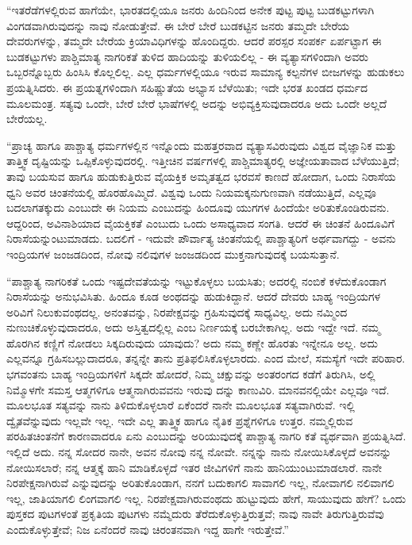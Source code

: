 “ಇತರೆಡೆಗಳಲ್ಲಿರುವ ಹಾಗೆಯೇ, ಭಾರತದಲ್ಲಿಯೂ ಜನರು ಹಿಂದಿನಿಂದ ಅನೇಕ ಪುಟ್ಟ ಪುಟ್ಟ ಬುಡಕಟ್ಟುಗಳಾಗಿ ವಿಂಗಡವಾಗಿರುವುದನ್ನು ನಾವು ನೋಡುತ್ತೇವೆ. ಈ ಬೇರೆ ಬೇರೆ ಬುಡಕಟ್ಟಿನ ಜನರು ತಮ್ಮದೇ ಬೇರೆಯ ದೇವರುಗಳನ್ನು, ತಮ್ಮದೇ ಬೇರೆಯ ಕ್ರಿಯಾವಿಧಿಗಳನ್ನು ಹೊಂದಿದ್ದರು. ಆದರೆ ಪರಸ್ಪರ ಸಂಪರ್ಕ ಏರ್ಪಟ್ಟಾಗ ಈ ಬುಡಕಟ್ಟುಗಳು ಪಾಶ್ಚಿಮಾತ್ಯ ನಾಗರಿಕತೆ ತುಳಿದ ಹಾದಿಯನ್ನು ತುಳಿಯಲಿಲ್ಲ - ಈ ವ್ಯತ್ಯಾಸಗಳಿಂದಾಗಿ ಅವರು ಒಬ್ಬರನ್ನೊಬ್ಬರು ಹಿಂಸಿಸಿ ಕೊಲ್ಲಲಿಲ್ಲ. ಎಲ್ಲ ಧರ್ಮಗಳಲ್ಲಿಯೂ ಇರುವ ಸಾಮಾನ್ಯ ಕಲ್ಪನೆಗಳ ಬೀಜಗಳನ್ನು ಹುಡುಕಲು ಪ್ರಯತ್ನಿಸಿದರು. ಈ ಪ್ರಯತ್ನಗಳಿಂದಾಗಿ ಸಹಿಷ್ಣುತೆಯ ಅಭ್ಯಾಸ ಬೆಳೆಯಿತು; ಇದೇ ಭರತ ಖಂಡದ ಧರ್ಮದ ಮೂಲಮಂತ್ರ. ಸತ್ಯವು ಒಂದೇ, ಬೇರೆ ಬೇರೆ ಭಾಷೆಗಳಲ್ಲಿ ಅದನ್ನು ಅಭಿವ್ಯಕ್ತಿಸುವುದಾದರೂ ಅದು ಒಂದೇ ಅಲ್ಲದೆ ಬೇರೆಯಲ್ಲ.

“ಪ್ರಾಚ್ಯ ಹಾಗೂ ಪಾಶ್ಚಾತ್ಯ ಧರ್ಮಗಳಲ್ಲಿನ ಇನ್ನೊಂದು ಮಹತ್ತರವಾದ ವ್ಯತ್ಯಾಸವಿರುವುದು ವಿಶ್ವದ ವೈಜ್ಞಾನಿಕ ಮತ್ತು ತಾತ್ತ್ವಿಕ ದೃಷ್ಟಿಯನ್ನು ಒಪ್ಪಿಕೊಳ್ಳುವುದರಲ್ಲಿ. ಇತ್ತೀಚಿನ ವರ್ಷಗಳಲ್ಲಿ ಪಾಶ್ಚಿಮಾತ್ಯರಲ್ಲಿ ಅಜ್ಞೇಯತಾವಾದ ಬೆಳೆಯುತ್ತಿದೆ; ತಾವು ಬಯಸುವ ಹಾಗೂ ಹುಡುಕುತ್ತಿರುವ ವೈಯಕ್ತಿಕ ಅಮೃತತ್ವದ ಭರವಸೆ ಕಾಣದೆ ಹೋದಾಗ, ಒಂದು ನಿರಾಸೆಯ ಧ್ವನಿ ಅವರ ಚಿಂತನೆಯಲ್ಲಿ ಹೊರಹೊಮ್ಮಿದೆ. ವಿಶ್ವವು ಒಂದು ನಿಯಮಕ್ಕನುಗುಣವಾಗಿ ನಡೆಯುತ್ತಿದೆ, ಎಲ್ಲವೂ ಬದಲಾಗತಕ್ಕುದು ಎಂಬುದೇ ಈ ನಿಯಮ ಎಂಬುದನ್ನು ಹಿಂದೂವು ಯುಗಗಳ ಹಿಂದೆಯೇ ಅರಿತುಕೊಂಡಿರುವನು. ಆದ್ದರಿಂದ, ಅವಿನಾಶಿಯಾದ ವೈಯಕ್ತಿಕತೆ ಎಂಬುದು ಒಂದು ಅಸಾಧ್ಯವಾದ ಸಂಗತಿ. ಆದರೆ ಈ ಚಿಂತನೆ ಹಿಂದೂವಿಗೆ ನಿರಾಸೆಯನ್ನುಂಟುಮಾಡದು. ಬದಲಿಗೆ - ಇದುವೇ ಪೌರ್ವಾತ್ಯ ಚಿಂತನೆಯಲ್ಲಿ ಪಾಶ್ಚಾತ್ಯರಿಗೆ ಅರ್ಥವಾಗದ್ದು - ಅವನು ಇಂದ್ರಿಯಗಳ ಜಂಜಡದಿಂದ, ನೋವು ನಲಿವುಗಳ ಜಂಜಡದಿಂದ ಮುಕ್ತನಾಗುವುದಕ್ಕೆ ಬಯಸುತ್ತಾನೆ.

“ಪಾಶ್ಚಾತ್ಯ ನಾಗರಿಕತೆ ಒಂದು ಇಷ್ಟದೇವತೆಯನ್ನು ಇಟ್ಟುಕೊಳ್ಳಲು ಬಯಸಿತು; ಅದರಲ್ಲಿ ನಂಬಿಕೆ ಕಳೆದುಕೊಂಡಾಗ ನಿರಾಸೆಯನ್ನು ಅನುಭವಿಸಿತು. ಹಿಂದೂ ಕೂಡ ಅಂಥದನ್ನು ಹುಡುಕಿದ್ದಾನೆ. ಆದರೆ ದೇವರು ಬಾಹ್ಯ ಇಂದ್ರಿಯಗಳ ಅರಿವಿಗೆ ನಿಲುಕುವಂಥದಲ್ಲ. ಅನಂತವನ್ನು, ನಿರಪೇಕ್ಷವನ್ನು ಗ್ರಹಿಸುವುದಕ್ಕೆ ಸಾಧ್ಯವಿಲ್ಲ. ಅದು ನಮ್ಮಿಂದ ನುಣುಚಿಕೊಳ್ಳುವುದಾದರೂ, ಅದು ಅಸ್ತಿತ್ವದಲ್ಲಿಲ್ಲ ಎಂಬ ನಿರ್ಣಯಕ್ಕೆ ಬರಬೇಕಾಗಿಲ್ಲ. ಅದು ಇದ್ದೇ ಇದೆ. ನಮ್ಮ ಹೊರಗಿನ ಕಣ್ಣಿಗೆ ನೋಡಲು ಸಿಕ್ಕದಿರುವುದು ಯಾವುದು? ಅದು ನಮ್ಮ ಕಣ್ಣೇ ಹೊರತು ಇನ್ನೇನೂ ಅಲ್ಲ. ಅದು ಎಲ್ಲವನ್ನೂ ಗ್ರಹಿಸಬಲ್ಲುದಾದರೂ, ತನ್ನನ್ನೇ ತಾನು ಪ್ರತಿಫಲಿಸಿಕೊಳ್ಳಲಾರದು. ಎಂದ ಮೇಲೆ, ಸಮಸ್ಯೆಗೆ ಇದೇ ಪರಿಹಾರ. ಭಗವಂತನು ಬಾಹ್ಯ ಇಂದ್ರಿಯಗಳಿಗೆ ಸಿಕ್ಕದೇ ಹೋದರೆ, ನಿಮ್ಮ ಚಕ್ಷುವನ್ನು ಅಂತರಂಗದ ಕಡೆಗೆ ತಿರುಗಿಸಿ, ಅಲ್ಲಿ ನಿಮ್ಮೊಳಗೇ ಸಮಸ್ತ ಆತ್ಮಗಳಿಗೂ ಆತ್ಮನಾಗಿರುವವನು ಇರುವು ದನ್ನು ಕಾಣುವಿರಿ. ಮಾನವನಲ್ಲಿಯೇ ಎಲ್ಲವೂ ಇದೆ. ಮೂಲಭೂತ ಸತ್ಯವನ್ನು ನಾನು ತಿಳಿದುಕೊಳ್ಳಲಾರೆ ಏಕೆಂದರೆ ನಾನೇ ಮೂಲಭೂತ ಸತ್ಯವಾಗಿರುವೆ. ಇಲ್ಲಿ ದ್ವೈತವೆನ್ನುವುದು ಇಲ್ಲವೇ ಇಲ್ಲ. ಇದೇ ಎಲ್ಲ ತಾತ್ತ್ವಿಕ ಹಾಗೂ ನೈತಿಕ ಪ್ರಶ್ನೆಗಳಿಗೂ ಉತ್ತರ. ನಮ್ಮಲ್ಲಿರುವ ಪರಹಿತಚಿಂತನೆಗೆ ಕಾರಣವಾದರೂ ಏನು ಎಂಬುದನ್ನು ಅರಿಯುವುದಕ್ಕೆ ಪಾಶ್ಚಾತ್ಯ ನಾಗರಿ ಕತೆ ವ್ಯರ್ಥವಾಗಿ ಪ್ರಯತ್ನಿಸಿದೆ. ಇಲ್ಲಿದೆ ಅದು. ನನ್ನ ಸೋದರ ನಾನೇ, ಅವನ ನೋವು ನನ್ನ ನೋವೇ. ನನ್ನನ್ನು ನಾನು ನೋಯಿಸಿಕೊಳ್ಳದೆ ಅವನನ್ನು ನೋಯಿಸಲಾರೆ; ನನ್ನ ಆತ್ಮಕ್ಕೆ ಹಾನಿ ಮಾಡಿಕೊಳ್ಳದೆ ಇತರ ಜೀವಿಗಳಿಗೆ ನಾನು ಹಾನಿಯುಂಟುಮಾಡಲಾರೆ. ನಾನೇ ನಿರಪೇಕ್ಷನಾಗಿರುವೆ ಎನ್ನುವುದನ್ನು ಅರಿತುಕೊಂಡಾಗ, ನನಗೆ ಬದುಕಾಗಲಿ ಸಾವಾಗಲಿ ಇಲ್ಲ, ನೋವಾಗಲಿ ನಲಿವಾಗಲಿ ಇಲ್ಲ, ಜಾತಿಯಾಗಲಿ ಲಿಂಗವಾಗಲಿ ಇಲ್ಲ. ನಿರಪೇಕ್ಷವಾಗಿರುವಂಥದು ಹುಟ್ಟುವುದು ಹೇಗೆ, ಸಾಯುವುದು ಹೇಗೆ? ಒಂದು ಪುಸ್ತಕದ ಪುಟಗಳಂತೆ ಪ್ರಕೃತಿಯ ಪುಟಗಳು ನಮ್ಮೆದುರು ತೆರೆದುಕೊಳ್ಳುತ್ತಿರುತ್ತವೆ; ನಾವು ನಾವೇ ತಿರುಗುತ್ತಿರುವೆವು ಎಂದುಕೊಳ್ಳುತ್ತೇವೆ; ನಿಜ ಏನೆಂದರೆ ನಾವು ಚಿರಂತನವಾಗಿ ಇದ್ದ ಹಾಗೇ ಇರುತ್ತೇವೆ.”

